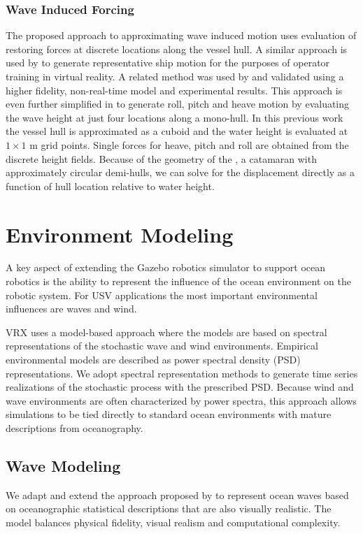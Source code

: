 \documentclass[utf8]{frontiersSCNS} %
\begin{document}
\subsubsection{Wave Induced Forcing}
The proposed approach to approximating wave induced motion uses evaluation of restoring forces at discrete locations along the vessel hull. A similar approach is used by \citet{ueng08ship} to generate representative ship motion for the purposes of operator training in virtual reality. A related method was used by \citet{sandaruwan12user} and validated using a higher fidelity, non-real-time model and experimental results. This approach is even further simplified in \citet{yeo12simulating} to generate roll, pitch and heave motion by evaluating the wave height at just four locations along a mono-hull. In this previous work the vessel hull is approximated as a cuboid and the water height is evaluated at $1 \times  1$ m grid points. Single forces for heave, pitch and roll are obtained from the discrete height fields. Because of the geometry of the \wamv{}, a catamaran with approximately circular demi-hulls, we can solve for the displacement directly as a function of hull location relative to water height. 

\section{Environment Modeling}
A key aspect of extending the Gazebo robotics simulator to support ocean robotics is the ability to represent the influence of the ocean environment on the robotic system. For USV applications the most important environmental influences are waves and wind.

VRX uses a model-based approach where the models are based on spectral representations of the stochastic wave and wind environments. Empirical environmental models are described as power spectral density (PSD) representations. We adopt spectral representation methods \citep{shinozuka91simulation} to generate time series realizations of the stochastic process with the prescribed PSD. Because wind and wave environments are often characterized by power spectra, this approach allows simulations to be tied directly to standard ocean environments with mature descriptions from oceanography.

\subsection{Wave Modeling}\label{s:wave}
We adapt and extend the approach proposed by \citet{thon00ocean} to represent ocean waves based on oceanographic statistical descriptions that are also visually realistic. The model balances physical fidelity, visual realism and computational complexity.
\end{document}
